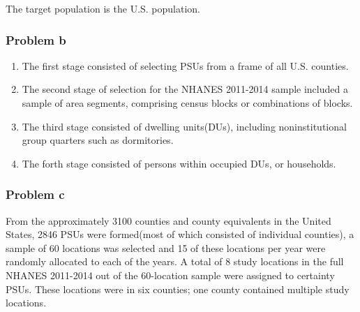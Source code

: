 \documentclass[]{article}
\begin{document}
The target population is the U.S. population.

\hypertarget{problem-b-1}{%
\subsubsection{Problem b}\label{problem-b-1}}

\begin{enumerate}
\def\labelenumi{\arabic{enumi}.}
\item
  The first stage consisted of selecting PSUs from a frame of all U.S.
  counties.
\item
  The second stage of selection for the NHANES 2011-2014 sample included
  a sample of area segments, comprising census blocks or combinations of
  blocks.
\item
  The third stage consisted of dwelling units(DUs), including
  noninstitutional group quarters such as dormitories.
\item
  The forth stage consisted of persons within occupied DUs, or
  households.
\end{enumerate}

\hypertarget{problem-c-1}{%
\subsubsection{Problem c}\label{problem-c-1}}

From the approximately 3100 counties and county equivalents in the
United States, 2846 PSUs were formed(most of which consisted of
individual counties), a sample of 60 locations was selected and 15 of
these locations per year were randomly allocated to each of the years. A
total of 8 study locations in the full NHANES 2011-2014 out of the
60-location sample were assigned to certainty PSUs. These locations were
in six counties; one county contained multiple study locations.
\end{document}
